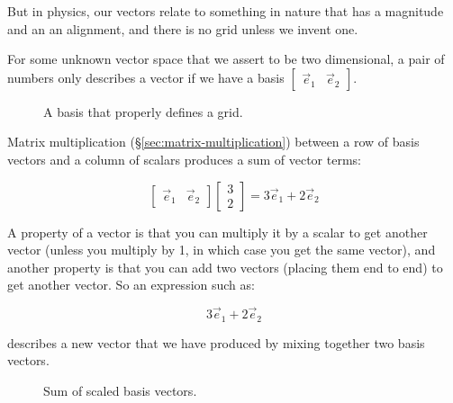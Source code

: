 But in physics, our vectors relate to something in nature that has a magnitude and an an alignment, and there is no grid unless we invent one.

For some unknown vector space that we assert to be two dimensional, a pair of numbers only describes a vector if we have a basis $\begin{bmatrix}\vec{e}_1 & \vec{e}_2\end{bmatrix}$.

\begin{figure}[h]
    \centering
    \caption{A basis that properly defines a grid.} \label{fig:vector-basis}
\end{figure}

Matrix multiplication (§\ref{sec:matrix-multiplication}) between a row of basis vectors and a column of scalars produces a sum of vector terms:

$$
\begin{bmatrix}\vec{e}_1 & \vec{e}_2\end{bmatrix}
\begin{bmatrix}3 \\ 2\end{bmatrix}
= 3\vec{e}_1 + 2\vec{e}_2
$$

A property of a vector is that you can multiply it by a scalar to get another vector (unless you multiply by 1, in which case you get the same vector), and another property is that you can add two vectors (placing them end to end) to get another vector. So an expression such as:

$$3\vec{e}_1 + 2\vec{e}_2$$

describes a new vector that we have produced by mixing together two basis vectors. 

\begin{figure}[h]
    \centering
    \caption{Sum of scaled basis vectors.} \label{fig:vector-sum}
\end{figure}

